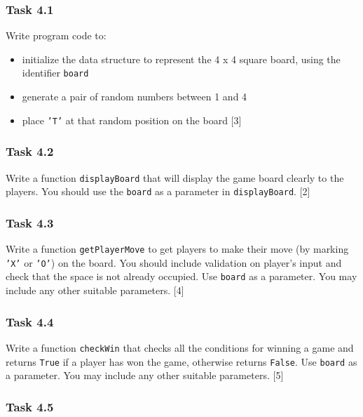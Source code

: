 \subsubsection*{Task 4.1 }

Write program code to: 
\begin{itemize}
\item initialize the data structure to represent the 4 x 4 square board,
using the identifier \texttt{board} 
\item generate a pair of random numbers between 1 and 4 
\item place \texttt{'T'} at that random position on the board \hfill{}{[}3{]}
\end{itemize}

\subsubsection*{Task 4.2 }

Write a function \texttt{displayBoard} that will display the game
board clearly to the players. You should use the \texttt{board} as
a parameter in \texttt{displayBoard}. \hfill{}{[}2{]}

\subsubsection*{Task 4.3 }

Write a function \texttt{getPlayerMove} to get players to make their
move (by marking \texttt{'X'} or \texttt{'O'}) on the board. You should
include validation on player\textquoteright s input and check that
the space is not already occupied. Use \texttt{board} as a parameter.
You may include any other suitable parameters. \hfill{}{[}4{]}

\subsubsection*{Task 4.4 }

Write a function \texttt{checkWin} that checks all the conditions
for winning a game and returns \texttt{True} if a player has won the
game, otherwise returns \texttt{False}. Use \texttt{board} as a parameter.
You may include any other suitable parameters. \hfill{} {[}5{]}

\subsubsection*{Task 4.5 }

